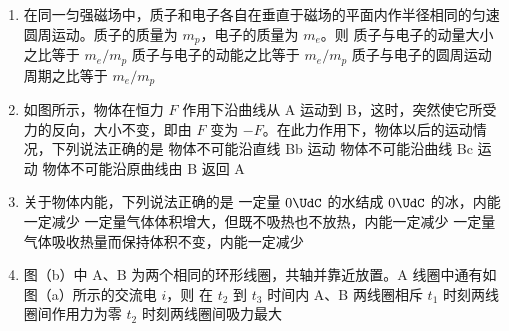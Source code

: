 \documentclass[\gkver]{gaokaozhenti}
\begin{document}
\begin{enumerate}
\item
在同一匀强磁场中，质子和电子各自在垂直于磁场的平面内作半径相同的匀速圆周运动。质子的质量为 $m_{p}$，电子的质量为 $m_{e}$。则
{质子与电子的动量大小之比等于 $m_{e}/m_{p}$}
{质子与电子的动能之比等于 $m_{e}/m_{p}$}
{质子与电子的圆周运动周期之比等于 $m_{e}/m_{p}$}

\item
如图所示，物体在恒力 $F$ 作用下沿曲线从 A 运动到 B，这时，突然使它所受力的反向，大小不变，即由 $F$ 变为 $-F$。在此力作用下，物体以后的运动情况，下列说法正确的是
\onepicture[w=3.89cm]{}
{物体不可能沿直线 Bb 运动}
{物体不可能沿曲线 Bc 运动}
{物体不可能沿原曲线由 B 返回 A}

\item
关于物体内能，下列说法正确的是
{一定量 $0\UdC$ 的水结成 $0\UdC$ 的冰，内能一定减少}
{一定量气体体积增大，但既不吸热也不放热，内能一定减少}
{一定量气体吸收热量而保持体积不变，内能一定减少}

\item
图（b）中 A、B 为两个相同的环形线圈，共轴并靠近放置。A 线圈中通有如图（a）所示的交流电 $i$，则
\onepicture[w=10.00cm]{}
{在 $t_{2}$ 到 $t_{3}$ 时间内 A、B 两线圈相斥}
{$t_{1}$ 时刻两线圈间作用力为零}
{$t_{2}$ 时刻两线圈间吸力最大}


\end{enumerate}
\end{document}
